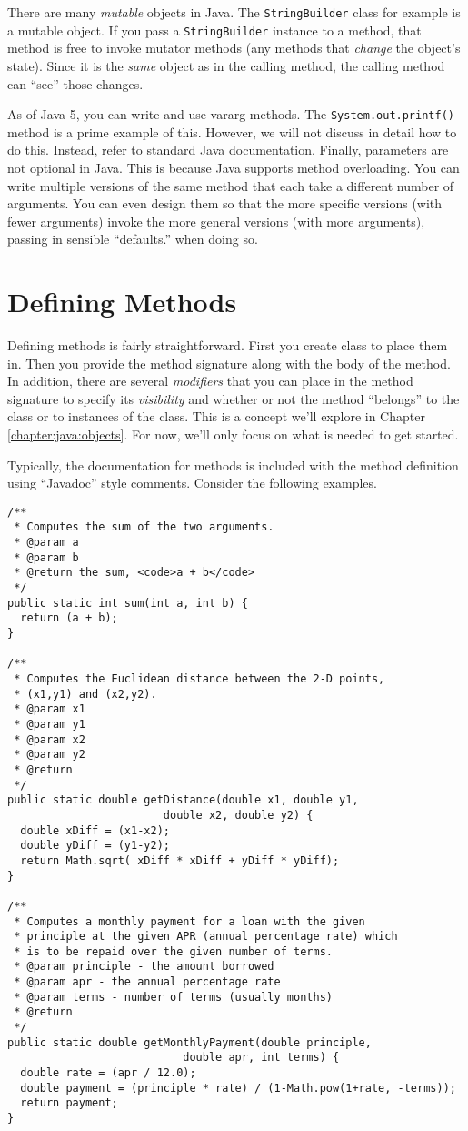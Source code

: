 There are many \emph{mutable} objects in Java.  The 
\texttt{StringBuilder} class for example is a mutable
object.  If you pass a \texttt{StringBuilder} instance
to a method, that method is free to invoke mutator methods 
(any methods that \emph{change} the object's state).  Since
it is the \emph{same} object as in the calling method, the
calling method can ``see'' those changes.

As of Java 5, you can write and use vararg methods.  The
\texttt{System.out.printf()} method is a prime
example of this.  However, we will not discuss in detail how
to do this.  Instead, refer to standard Java documentation.
Finally, parameters are not optional in Java.  This is because
Java supports method overloading.  You can write multiple
versions of the same method that each take a different
number of arguments.  You can even design them so that
the more specific versions (with fewer arguments) invoke
the more general versions (with more arguments), passing
in sensible ``defaults.'' when doing so.

\section{Defining Methods}

Defining methods is fairly straightforward.  First you create 
class to place them in.  Then you provide the method signature
along with the body of the method.  In addition, there are 
several \emph{modifiers} that you can place in the method 
signature to specify its \emph{visibility} and whether or not
the method ``belongs'' to the class or to instances of the 
class.  This is a concept we'll explore in Chapter \ref{chapter:java:objects}.
For now, we'll only focus on what is needed to get started.

Typically, the documentation for methods is included with 
the method definition using ``Javadoc'' style comments.
Consider the following examples.

\begin{verbatim}
/**
 * Computes the sum of the two arguments.
 * @param a
 * @param b
 * @return the sum, <code>a + b</code>
 */
public static int sum(int a, int b) {
  return (a + b);
}

/**
 * Computes the Euclidean distance between the 2-D points, 
 * (x1,y1) and (x2,y2).
 * @param x1
 * @param y1
 * @param x2
 * @param y2
 * @return
 */
public static double getDistance(double x1, double y1, 
                        double x2, double y2) {
  double xDiff = (x1-x2);
  double yDiff = (y1-y2);
  return Math.sqrt( xDiff * xDiff + yDiff * yDiff);
}

/**
 * Computes a monthly payment for a loan with the given
 * principle at the given APR (annual percentage rate) which
 * is to be repaid over the given number of terms.
 * @param principle - the amount borrowed
 * @param apr - the annual percentage rate
 * @param terms - number of terms (usually months)
 * @return
 */
public static double getMonthlyPayment(double principle, 
                           double apr, int terms) {
  double rate = (apr / 12.0);
  double payment = (principle * rate) / (1-Math.pow(1+rate, -terms));
  return payment;
}
\end{verbatim}

